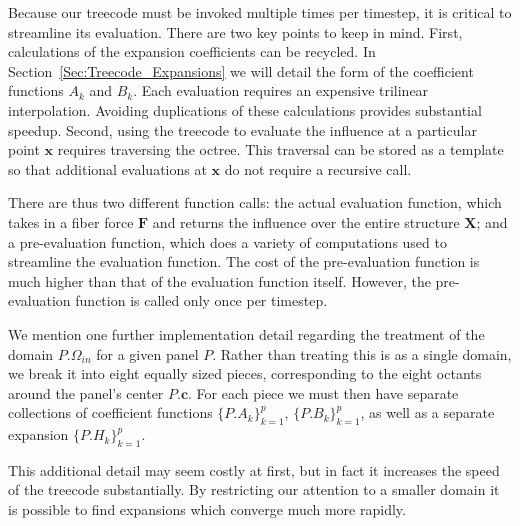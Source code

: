 \documentclass[preprint,12pt]{elsarticle}
\newcommand{\B}[1]{\mathbf{#1}}
\newcommand{\Panel}[1]{#1}
\begin{document}
Because our treecode must be invoked multiple times per timestep, it is critical to streamline its evaluation. There are two key points to keep in mind. First, calculations of the expansion coefficients can be recycled. In Section~\ref{Sec:Treecode_Expansions} we will detail the form of the coefficient functions $A_k$ and $B_k$. Each evaluation requires an expensive trilinear interpolation. Avoiding duplications of these calculations provides substantial speedup. Second, using the treecode to evaluate the influence at a particular point $\B{x}$ requires traversing the octree. This traversal can be stored as a template so that additional evaluations at $\B{x}$ do not require a recursive call.

There are thus two different function calls: the actual evaluation function, which takes in a fiber force $\B{F}$ and returns the influence over the entire structure $\B{X}$; and a pre-evaluation function, which does a variety of computations used to streamline the evaluation function. The cost of the pre-evaluation function is much higher than that of the evaluation function itself. However, the pre-evaluation function is called only once per timestep.

We mention one further implementation detail regarding the treatment of the domain $\Panel{P}.\Omega_{in}$ for a given panel $\Panel{P}$. Rather than treating this is as a single domain,  we break it into eight equally sized pieces, corresponding to the eight octants around the panel's center $\Panel{P}.\B{c}$. For each piece we must then have separate collections of coefficient functions $\{\Panel{P}.A_k\}_{k=1}^{p}$, $\{\Panel{P}.B_k\}_{k=1}^{p}$, as well as a separate expansion $\{\Panel{P}.H_k\}_{k=1}^{p}$.

This additional detail may seem costly at first, but in fact it increases the speed of the treecode substantially. By restricting our attention to a smaller domain it is possible to find expansions which converge much more rapidly.
\end{document}
